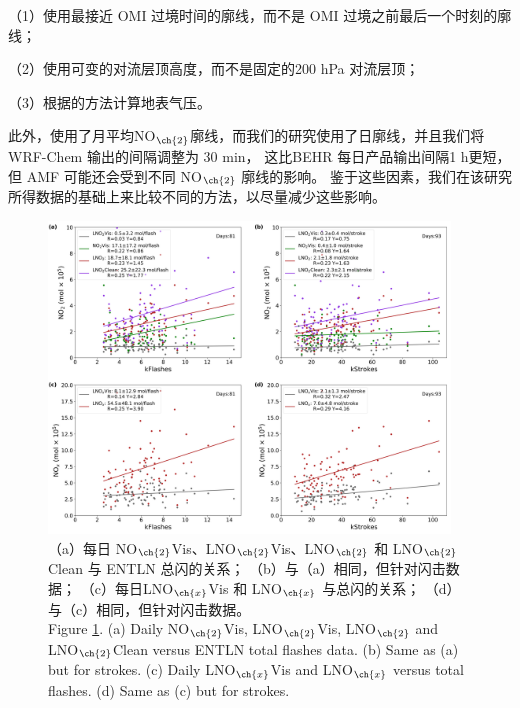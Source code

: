 （1）使用最接近 OMI 过境时间的廓线，而不是 OMI 过境之前最后一个时刻的廓线；

（2）使用可变的对流层顶高度，而不是固定的200 hPa 对流层顶；

（3）根据\citet{Zhou.2009}的方法计算地表气压。

此外，\citet{Lapierre.2020}使用了月平均NO$_{\ch{2}}$廓线，而我们的研究使用了日廓线，并且我们将WRF-Chem 输出的间隔调整为 30 min，
这比BEHR 每日产品输出间隔1 h更短，但 AMF 可能还会受到不同 NO$_{\ch{2}}$ 廓线的影响。
鉴于这些因素，我们在该研究所得数据的基础上来比较不同的方法，以尽量减少这些影响。

\begin{figure}[H]
\centering
\includegraphics[width=0.95\textwidth]{./figures/us_pe_linear.png}
\caption{（a）每日 NO$_{\ch{2}}$Vis、LNO$_{\ch{2}}$Vis、LNO$_{\ch{2}}$ 和 LNO$_{\ch{2}}$Clean 与 ENTLN 总闪的关系；
（b）与（a）相同，但针对闪击数据；
（c）每日LNO$_{\ch{x}}$Vis 和 LNO$_{\ch{x}}$ 与总闪的关系；
（d）与（c）相同，但针对闪击数据。\\
Figure \ref{fig:us_pe_linear}.
(a) Daily NO$_{\ch{2}}$Vis, LNO$_{\ch{2}}$Vis, LNO$_{\ch{2}}$ and LNO$_{\ch{2}}$Clean versus ENTLN total flashes data.
(b) Same as (a) but for strokes.
(c) Daily LNO$_{\ch{x}}$Vis and LNO$_{\ch{x}}$ versus total flashes.
(d) Same as (c) but for strokes.}
\label{fig:us_pe_linear}
\end{figure}



